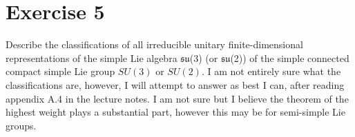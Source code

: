 \documentclass[12pt]{article}
\newcommand{\ket}[1]{\vert{#1}\rangle}
\begin{document}
\section*{Exercise 5}
Describe the classifications of all irreducible unitary finite-dimensional representations of the simple Lie algebra $\mathfrak{su}$(3) (or $\mathfrak{su}$(2)) of the simple connected compact simple Lie group $SU(3)$ or $SU(2)$. I am not entirely sure what the classifications are, however, I will attempt to answer as best I can, after reading appendix A.4 in the lecture notes. I am not sure but I believe the theorem of the highest weight plays a substantial part, however this may be for semi-simple Lie groups. 
\\


\end{document}
